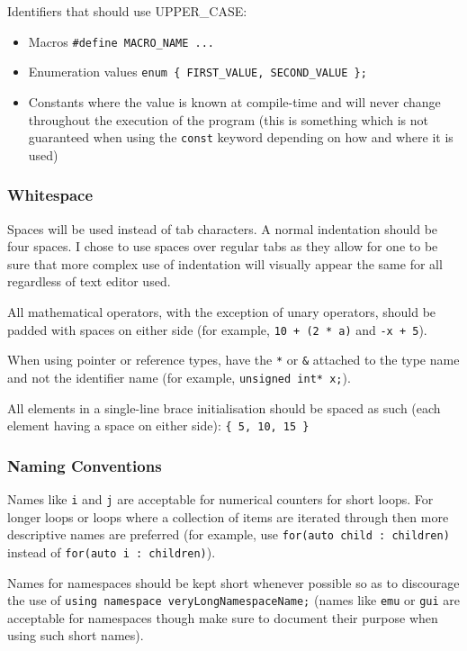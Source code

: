         Identifiers that should use UPPER\_CASE:
        \begin{itemize}
            \item Macros \texttt{\#define MACRO\_NAME ...}
            \item Enumeration values \texttt{enum \{ FIRST\_VALUE, SECOND\_VALUE \};}
            \item Constants where the value is known at compile-time and will never change throughout the execution of the program (this is something which is not guaranteed when using the \texttt{const} keyword depending on how and where it is used)
        \end{itemize}

    \subsubsection{Whitespace}
        Spaces will be used instead of tab characters. A normal indentation should be four spaces. I chose to use spaces over regular tabs as they allow for one to be sure that more complex use of indentation will visually appear the same for all regardless of text editor used.

        All mathematical operators, with the exception of unary operators, should be padded with spaces on either side (for example, \texttt{10 + (2 * a)} and \texttt{-x + 5}).

        When using pointer or reference types, have the \texttt{*} or \texttt{\&} attached to the type name and not the identifier name (for example, \texttt{unsigned int* x;}).

        All elements in a single-line brace initialisation should be spaced as such (each element having a space on either side): \texttt{\{ 5, 10, 15 \}}

    \subsubsection{Naming Conventions}
        Names like \texttt{i} and \texttt{j} are acceptable for numerical counters for short loops. For longer loops or loops where a collection of items are iterated through then more descriptive names are preferred (for example, use \texttt{for(auto child : children)} instead of \texttt{for(auto i : children)}).

        Names for namespaces should be kept short whenever possible so as to discourage the use of \texttt{using namespace veryLongNamespaceName;} (names like \texttt{emu} or \texttt{gui} are acceptable for namespaces though make sure to document their purpose when using such short names).

